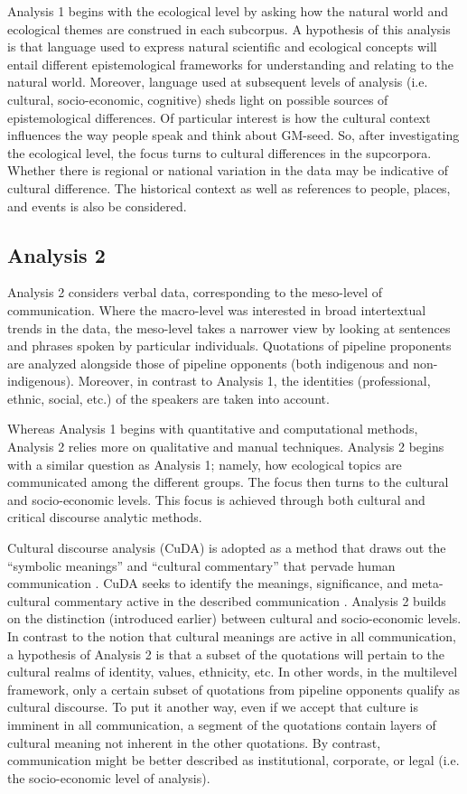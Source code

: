 Analysis 1 begins with the ecological level by asking how the natural world and ecological themes are construed in each subcorpus. A hypothesis of this analysis is that language used to express natural scientific and ecological concepts will entail different epistemological frameworks for understanding and relating to the natural world. Moreover, language used at subsequent levels of analysis (i.e. cultural, socio-economic, cognitive) sheds light on possible sources of epistemological differences. Of particular interest is how the cultural context influences the way people speak and think about GM-seed. So, after investigating the ecological level, the focus turns to cultural differences in the supcorpora. Whether there is regional or national variation in the data may be indicative of cultural difference. The historical context as well as references to people, places, and events is also be considered.

\subsection{Analysis 2}

Analysis 2 considers verbal data, corresponding to the meso-level of communication. Where the macro-level was interested in broad intertextual trends in the data, the meso-level takes a narrower view by looking at sentences and phrases spoken by particular individuals. Quotations of pipeline proponents are analyzed alongside those of pipeline opponents (both indigenous and non-indigenous). Moreover, in contrast to Analysis 1, the identities (professional, ethnic, social, etc.) of the speakers are taken into account. 

Whereas Analysis 1 begins with quantitative and computational methods, Analysis 2 relies more on qualitative and manual techniques. Analysis 2 begins with a similar question as Analysis 1; namely, how ecological topics are communicated among the different groups. The focus then turns to the cultural and socio-economic levels. This focus is achieved through both cultural and critical discourse analytic methods.

Cultural discourse analysis (CuDA) is adopted as a method that draws out the ``symbolic meanings'' and ``cultural commentary'' that pervade human communication \citep[168]{Carbaugh2007a}. CuDA seeks to identify the meanings, significance, and meta-cultural commentary active in the described communication \citep[172-74]{Carbaugh2007a}. Analysis 2 builds on the distinction (introduced earlier) between cultural and socio-economic levels. In contrast to the notion that cultural meanings are active in all communication, a hypothesis of Analysis 2 is that a subset of the quotations will pertain to the cultural realms of identity, values, ethnicity, etc. In other words, in the multilevel framework, only a certain subset of quotations from pipeline opponents qualify as cultural discourse. To put it another way, even if we accept that culture is imminent in all communication, a segment of the quotations contain layers of cultural meaning not inherent in the other quotations. By contrast, communication might be better described as institutional, corporate, or legal (i.e. the socio-economic level of analysis). 

